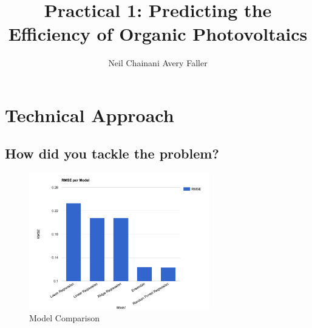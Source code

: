 \documentclass[]{article}
\title{{\bf Practical 1}: Predicting the Efficiency of Organic Photovoltaics}
\author{Neil Chainani
		Avery Faller}
\begin{document}
	
\maketitle

\section{Technical Approach}
\subsection*{How did you tackle the problem?}
\begin{figure}[h]
	\centering
	\includegraphics[width=0.7\textwidth]{ModelComparison}
	\caption{Model Comparison}
\end{figure}
\end{document}
